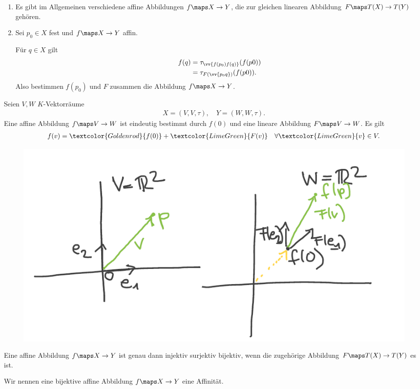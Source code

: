 \begin{bemerkung*}
    \begin{enumerate}
        \item Es gibt im Allgemeinen verschiedene affine Abbildungen \( f\maps X \to Y \), die zur gleichen linearen Abbildung \( F\maps T(X)\to T(Y) \) gehören.
        \item Sei \( p_0 \in X \) fest und \( f\maps X \to Y \) affin.
        
        Für \( q\in X \) gilt
        \begin{align*}
            f(q)\begin{aligned}[t] 
                &=\tau_{\vv{f(p_0)f(q)}}(f(p0))\\
            &=\tau_{F(\vv{p_0 q})}(f(p0)).
            \end{aligned}
        \end{align*}
        Also bestimmen \( f(p_0) \) und \( F \) zusammen die Abbildung \( f\maps X\to Y \).
    \end{enumerate}


\end{bemerkung*}
\begin{beispiel*}
    Seien \( V,W \) \( K \)-Vektorräume
    \begin{align*}
        X=(V,V,\tau),\quad Y=(W,W,\tau).
    \end{align*}
    Eine affine Abbildung \( f\maps V\to W \) ist eindeutig bestimmt durch \( f(0) \) und eine lineare Abbildung \( F\maps V\to W \). Es gilt
    \begin{align*}
        f(v)=\textcolor{Goldenrod}{f(0)}+\textcolor{LimeGreen}{F(v)}\quad\forall \textcolor{LimeGreen}{v} \in V.
    \end{align*}
\end{beispiel*}
\begin{figure}[H]
    \centering
    \includegraphics[width=0.7\linewidth]{figures/affine_abbildungen_vektorraeume}
    \label{fig:affine_abbildungen_vektorraeume}
\end{figure}
\begin{bemuebung*}
    Eine affine Abbildung \( f\maps X \to Y \) ist genau dann injektiv \bzw surjektiv \bzw bijektiv, wenn die zugehörige Abbildung \( F\maps T(X)\to T(Y) \) es ist.
\end{bemuebung*}
\begin{definition*}
    Wir nennen eine bijektive affine Abbildung \( f\maps X \to Y \) eine Affinität.
\end{definition*}

